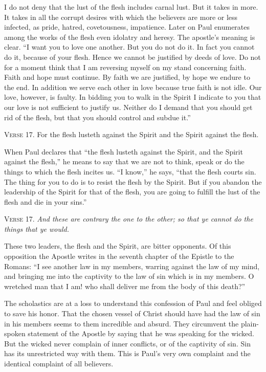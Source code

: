 I do not deny that the lust of the flesh includes carnal lust. But it takes in more. It takes in all the corrupt desires with which the believers are more or less infected, as pride, hatred, covetousness, impatience. Later on Paul enumerates among the works of the flesh even idolatry and heresy. The apostle’s meaning is clear. “I want you to love one another. But you do not do it. In fact you cannot do it, because of your flesh. Hence we cannot be justified by deeds of love. Do not for a moment think that I am reversing myself on my stand concerning faith. Faith and hope must continue. By faith we are justified, by hope we endure to the end. In addition we serve each other in love because true faith is not idle. Our love, however, is faulty. In bidding you to walk in the Spirit I indicate to you that our love is not sufficient to justify us. Neither do I demand that you should get rid of the flesh, but that you should control and subdue it.”

\textsc{Verse} 17. For the flesh lusteth against the Spirit and the Spirit against the flesh.

When Paul declares that “the flesh lusteth against the Spirit, and the Spirit against the flesh,” he means to say that we are not to think, speak or do the things to which the flesh incites us. “I know,” he says, “that the flesh courts sin. The thing for you to do is to resist the flesh by the Spirit. But if you abandon the leadership of the Spirit for that of the flesh, you are going to fulfill the lust of the flesh and die in your sins.”

\textsc{Verse} 17. \emph{And these are contrary the one to the other; so that ye cannot do the things that ye would.}

These two leaders, the flesh and the Spirit, are bitter opponents. Of this opposition the Apostle writes in the seventh chapter of the Epistle to the Romans: “I see another law in my members, warring against the law of my mind, and bringing me into the captivity to the law of sin which is in my members. O wretched man that I am! who shall deliver me from the body of this death?”

The scholastics are at a loss to understand this confession of Paul and feel obliged to save his honor. That the chosen vessel of Christ should have had the law of sin in his members seems to them incredible and absurd. They circumvent the plain-spoken statement of the Apostle by saying that he was speaking for the wicked. But the wicked never complain of inner conflicts, or of the captivity of sin. Sin has its unrestricted way with them. This is Paul’s very own complaint and the identical complaint of all believers.

